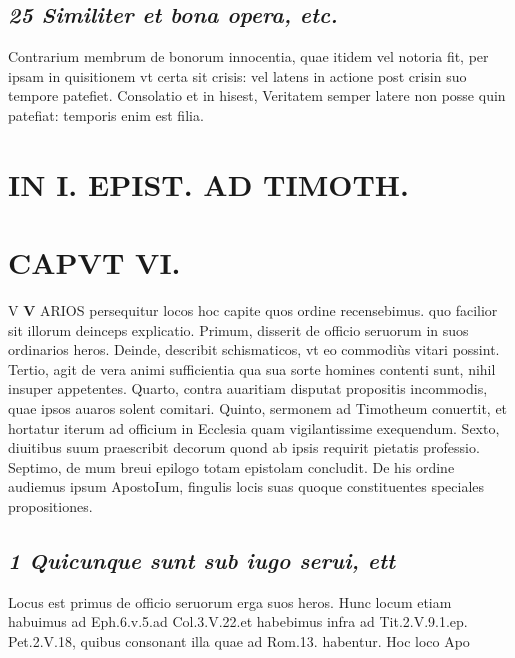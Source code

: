 \documentclass{article}
\begin{document}
\begin{pages}
\subsection*{\textit{25 Similiter et bona opera, etc. }}\pstart Contrarium membrum de bonorum innocentia, quae itidem vel notoria fit, per ipsam in quisitionem vt certa sit crisis: vel latens in actione post crisin suo tempore patefiet. Consolatio et in hisest, Veritatem semper latere non posse quin patefiat: temporis enim est filia.  \pend
\section*{IN I. EPIST. AD TIMOTH. }
\marginpar{[ p.143 ]}
\endnumbering\beginnumbering\section{CAPVT VI.}V \pstart \textbf{V} ARIOS persequitur locos hoc capite quos ordine recensebimus. quo facilior sit illorum deinceps explicatio. Primum, disserit de officio seruorum in suos ordinarios heros. Deinde, describit schismaticos, vt eo commodiùs vitari possint. Tertio, agit de vera animi sufficientia qua sua sorte homines contenti sunt, nihil insuper appetentes. Quarto, contra auaritiam disputat propositis incommodis, quae ipsos auaros solent comitari. Quinto, sermonem ad Timotheum conuertit, et hortatur iterum ad officium in Ecclesia quam vigilantissime exequendum. Sexto, diuitibus suum praescribit decorum quond ab ipsis requirit pietatis professio. Septimo, de mum breui epilogo totam epistolam concludit. De his ordine audiemus ipsum ApostoIum, fingulis locis suas quoque constituentes speciales propositiones.  \pend
{}
{}
\subsection*{\textit{1 Quicunque sunt sub iugo serui, ett }}\pstart Locus est primus de officio seruorum erga suos heros. Hunc locum etiam habuimus ad Eph.6.v.5.ad Col.3.V.22.et habebimus infra ad Tit.2.V.9.1.ep. Pet.2.V.18, quibus consonant illa quae ad Rom.13. habentur. Hoc loco Apo\pend

\end{pages}
\end{document}
